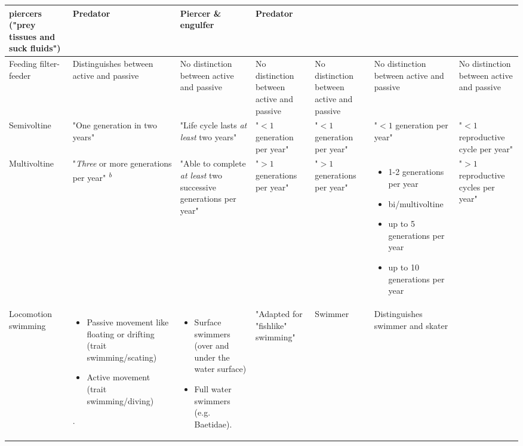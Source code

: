 \documentclass[../Draft_harmonization_paper.tex]{subfiles}
\begin{document}
\begin{landscape}
\begin{longtable}{m{1.7cm}|m{3cm}|m{3cm}|m{3cm}|m{3cm}|m{3cm}|m{3cm}}
        piercers ("prey tissues and suck fluids") & 
        Predator &
        Piercer \& engulfer &
        Predator
        \\ 
        \midrule
        Feeding filter-feeder & 
        Distinguishes between active and passive &
        No distinction between active and passive &
        No distinction between active and passive &
        No distinction between active and passive &
        No distinction between active and passive &
        No distinction between active and passive
        \\
        \toprule[.1em]
        Semivoltine & 
        "One generation in two years" & 
        "Life cycle lasts \textit{at least} two years" & 
        "$< 1$ generation per year" & 
        "$< 1$ generation per year" & 
        "$< 1$ generation per year" & 
        "$< 1$ reproductive cycle per year"
        \\
        \midrule
        Multivoltine & 
        "\textit{Three} or more generations per year" \textsuperscript{\textit{b}}& 
        "Able to complete \textit{at least} two successive generations per year" &
        "$> 1$ generations per year" &
        "$> 1$ generations per year" & 
        \begin{itemize}
            \item 1-2 generations per year
            \item bi/multivoltine
            \item up to 5 generations per year
            \item up to 10 generations per year
        \end{itemize}
        & 
        "$> 1$ reproductive cycles per year"
        \\
        \toprule[.1em]
        Locomotion swimming & 
        \begin{itemize}
            \item Passive movement like floating or drifting (trait swimming/scating)
            \item Active movement (trait swimming/diving)
        \end{itemize}. &
        \begin{itemize}
            \item Surface swimmers (over and under the water surface)
            \item Full water swimmers (e.g. Baetidae).
        \end{itemize} & 
        "Adapted for "fishlike" swimming" & 
        Swimmer & 
        Distinguishes swimmer and skater & 

\end{longtable}
\end{landscape}
\end{document}
